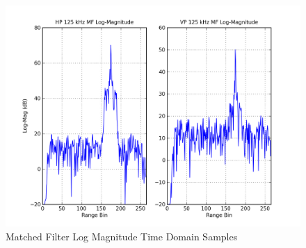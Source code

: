 \documentclass[12pt,english]{article}
\begin{document}
\begin{figure}[htb]
  \noindent \begin{centering}
  \includegraphics[width=4.75in]{125kHzMfLogMagPT8_AH0_AV0M2.png}\medskip{}
  \caption{Matched Filter Log Magnitude Time Domain Samples}
  \label{fig:125kHzMfLogMagPT8_AH0_AV0M2}
  \par \end{centering}
\end{figure}
\end{document}
